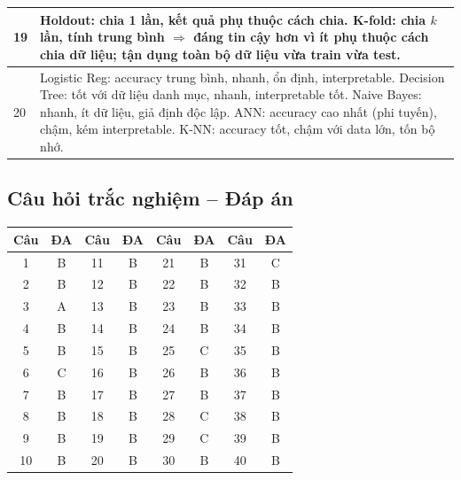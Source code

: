 \documentclass[10pt]{article}
\begin{document}
\begin{singlespace}
\begin{longtable}{|p{}|p{}|}
\hline
19 & Holdout: chia 1 lần, kết quả phụ thuộc cách chia. K-fold: chia $k$ lần, tính trung bình $\Rightarrow$ đáng tin cậy hơn vì ít phụ thuộc cách chia dữ liệu; tận dụng toàn bộ dữ liệu vừa train vừa test. \\
\hline
20 & Logistic Reg: accuracy trung bình, nhanh, ổn định, interpretable. Decision Tree: tốt với dữ liệu danh mục, nhanh, interpretable tốt. Naive Bayes: nhanh, ít dữ liệu, giả định độc lập. ANN: accuracy cao nhất (phi tuyến), chậm, kém interpretable. K-NN: accuracy tốt, chậm với data lớn, tốn bộ nhớ. \\
\hline
\end{longtable}
\end{singlespace}

\subsection*{Câu hỏi trắc nghiệm -- Đáp án}

\begin{singlespace}
\begin{longtable}{|c|c||c|c||c|c||c|c|}
\hline
\textbf{Câu} & \textbf{ĐA} & \textbf{Câu} & \textbf{ĐA} & \textbf{Câu} & \textbf{ĐA} & \textbf{Câu} & \textbf{ĐA} \\
\hline
\endhead
1 & B & 11 & B & 21 & B & 31 & C \\
\hline
2 & B & 12 & B & 22 & B & 32 & B \\
\hline
3 & A & 13 & B & 23 & B & 33 & B \\
\hline
4 & B & 14 & B & 24 & B & 34 & B \\
\hline
5 & B & 15 & B & 25 & C & 35 & B \\
\hline
6 & C & 16 & B & 26 & B & 36 & B \\
\hline
7 & B & 17 & B & 27 & B & 37 & B \\
\hline
8 & B & 18 & B & 28 & C & 38 & B \\
\hline
9 & B & 19 & B & 29 & C & 39 & B \\
\hline
10 & B & 20 & B & 30 & B & 40 & B \\
\hline
\end{longtable}
\end{singlespace}
\end{document}
